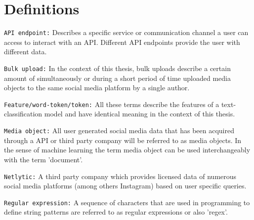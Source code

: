 \section*{Definitions} \label{definitions}
\texttt{API endpoint:} Describes a specific service or communication channel a user can access to interact with an API. Different API endpoints provide the user with different data.
\newline

\texttt{Bulk upload:} In the context of this thesis, bulk uploads describe a certain amount of simultaneously or during a short period of time uploaded media objects to the same social media platform by a single author.
\newline

\texttt{Feature/word-token/token:} All these terms describe the features of a text-classification model and have identical meaning in the context of this thesis.
\newline

\texttt{Media object:} All user generated social media data that has been acquired through a API or third party company will be referred to as media objects. In the sense of machine learning the term media object can be used interchangeably with the term 'document'.
\newline

\texttt{Netlytic:} A third party company which provides licensed data of numerous social media platforms (among others Instagram) based on user specific queries.
\newline

\texttt{Regular expression:} A sequence of characters that are used in programming to define string patterns are referred to as regular expressions or also 'regex'.




 \cleardoublepage

